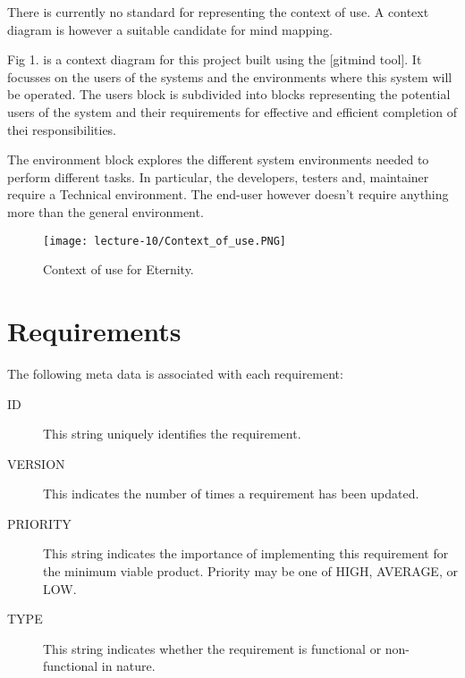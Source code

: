 \documentclass[11pt,a4paper]{report}
\theoremstyle{definition}
\theoremstyle{remark}
\begin{document}
            There is currently no standard for representing the context of use. A context diagram is however a suitable candidate for mind mapping. 
            
            Fig 1. is a context diagram for this project built using the [gitmind tool]. It focusses on the users of the systems and the environments where this system will be operated. The users block is subdivided into blocks representing the potential users of the system and their requirements for effective and efficient completion of thei responsibilities.
            
            The environment block explores the different system environments needed to perform different tasks. In particular, the developers, testers and, maintainer require a Technical environment. The end-user however doesn't require anything more than the general environment.
        
            \begin{figure}[htbp]
                \centering
                \texttt{[image: lecture-10/Context\_of\_use.PNG]}
                \caption{Context of use for Eternity.}
                \label{fig:context_of_use}
            \end{figure}

        \chapter{Requirements}
            The following meta data is associated with each requirement:
        
            \begin{description}
                \item[ID] This string uniquely identifies the requirement.
                \item[VERSION] This indicates the number of times a requirement has been updated.
                \item[PRIORITY] This string indicates the importance of implementing this requirement for the minimum viable product. Priority may be one of HIGH, AVERAGE, or LOW.
                \item[TYPE] This string indicates whether the requirement is functional or non-functional in nature.        
            \end{description}
            \vspace{3em}
\end{document}
